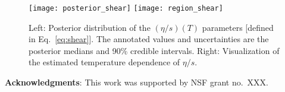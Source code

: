 \documentclass[3p,times,procedia,sort&compress]{elsarticle}
\begin{document}
\begin{figure}
  \texttt{[image: posterior\_shear]}
  \hfill
  \texttt{[image: region\_shear]}
  \caption{
    Left: Posterior distribution of the $(\eta/s)(T)$ parameters [defined in Eq.~\eqref{eq:shear}].
    The annotated values and uncertainties are the posterior medians and 90\% credible intervals.
    Right: Visualization of the estimated temperature dependence of $\eta/s$.
  }
  \label{fig:shear}
\end{figure}

\bigskip\noindent\textbf{Acknowledgments}: This work was supported by NSF grant no.\ XXX.



\end{document}
